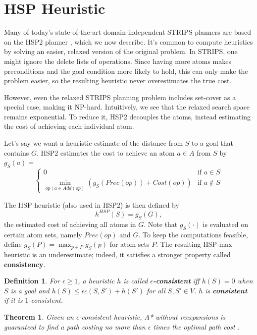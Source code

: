 \documentclass[letterpaper]{article}
\newtheorem{thm}{Theorem}
\newtheorem{defn}{Definition}
\begin{document}
\section{HSP Heuristic}

Many of today's state-of-the-art domain-independent STRIPS planners are based on the HSP2 planner \cite{bonet2001planning}, which we now describe.
It's common to compute heuristics by solving an easier, relaxed version of the original problem. In STRIPS, one might ignore the delete lists of operations.
Since having more atoms makes preconditions and the goal condition more likely to hold, this can only make the problem easier, so the resulting heuristic never overestimates the true cost.

However, even the relaxed STRIPS planning problem includes set-cover as a special case, making it NP-hard.
Intuitively, we see that the relaxed search space remains exponential.
To reduce it, HSP2 decouples the atoms, instead estimating the cost of achieving each individual atom.

Let's say we want a heuristic estimate of the distance from $S$ to a goal that contains $G$. HSP2 estimates the cost to achieve an atom $a\in A$ from $S$ by $g_S(a) = $
\[\begin{cases} 0  &\mbox{if } a \in S
\\ \min_{op\mid a\in Add(op)} \left(g_S(Prec(op)) + Cost(op)\right)  &\mbox{if } a \notin S \end{cases}\]

The HSP heuristic (also used in HSP2) is then defined by
\[h^{HSP}(S) = g_S(G),\]
the estimated cost of achieving all atoms in $G$. Note that $g_S(\cdot)$ is evaluated on certain atom sets, namely $Prec(op)$ and $G$.
To keep the computations feasible, define $g_S(P) = \max_{p\in P} g_S(p)$ for atom sets $P$.
The resulting HSP-max heuristic is an underestimate; indeed, it satisfies a stronger property called \textbf{consistency}.

\begin{defn} For $\epsilon\ge 1$, a heuristic $h$ is called \textbf{$\epsilon$-consistent} iff $h(S) = 0$ when $S$ is a goal and $h(S) \le \epsilon c(S,S') + h(S')$ for all $S,S'\in V$. $h$ is \textbf{consistent} if it is $1$-consistent. \end{defn}
\begin{thm} Given an $\epsilon$-consistent heuristic, A* without reexpansions is guaranteed to find a path costing no more than $\epsilon$ times the optimal path cost \cite{LikGorThr-ara}. \end{thm}
\end{document}
